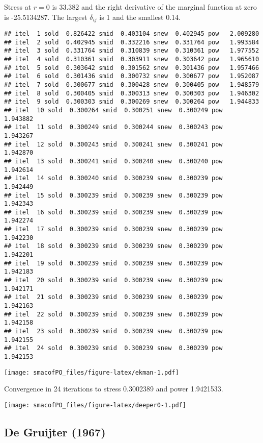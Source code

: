 \documentclass[
  12pt,
]{article}
\begin{document}
Stress at \(r=0\) is 33.382 and the right derivative of the marginal function at zero is -25.5134287. The largest \(\delta_{ij}\) is 1 and the smallest
0.14.

\begin{verbatim}
## itel  1 sold  0.826422 smid  0.403104 snew  0.402945 pow   2.009280 
## itel  2 sold  0.402945 smid  0.332216 snew  0.331764 pow   1.993584 
## itel  3 sold  0.331764 smid  0.310839 snew  0.310361 pow   1.977552 
## itel  4 sold  0.310361 smid  0.303911 snew  0.303642 pow   1.965610 
## itel  5 sold  0.303642 smid  0.301562 snew  0.301436 pow   1.957466 
## itel  6 sold  0.301436 smid  0.300732 snew  0.300677 pow   1.952087 
## itel  7 sold  0.300677 smid  0.300428 snew  0.300405 pow   1.948579 
## itel  8 sold  0.300405 smid  0.300313 snew  0.300303 pow   1.946302 
## itel  9 sold  0.300303 smid  0.300269 snew  0.300264 pow   1.944833 
## itel  10 sold  0.300264 smid  0.300251 snew  0.300249 pow   1.943882 
## itel  11 sold  0.300249 smid  0.300244 snew  0.300243 pow   1.943267 
## itel  12 sold  0.300243 smid  0.300241 snew  0.300241 pow   1.942870 
## itel  13 sold  0.300241 smid  0.300240 snew  0.300240 pow   1.942614 
## itel  14 sold  0.300240 smid  0.300239 snew  0.300239 pow   1.942449 
## itel  15 sold  0.300239 smid  0.300239 snew  0.300239 pow   1.942343 
## itel  16 sold  0.300239 smid  0.300239 snew  0.300239 pow   1.942274 
## itel  17 sold  0.300239 smid  0.300239 snew  0.300239 pow   1.942230 
## itel  18 sold  0.300239 smid  0.300239 snew  0.300239 pow   1.942201 
## itel  19 sold  0.300239 smid  0.300239 snew  0.300239 pow   1.942183 
## itel  20 sold  0.300239 smid  0.300239 snew  0.300239 pow   1.942171 
## itel  21 sold  0.300239 smid  0.300239 snew  0.300239 pow   1.942163 
## itel  22 sold  0.300239 smid  0.300239 snew  0.300239 pow   1.942158 
## itel  23 sold  0.300239 smid  0.300239 snew  0.300239 pow   1.942155 
## itel  24 sold  0.300239 smid  0.300239 snew  0.300239 pow   1.942153
\end{verbatim}

\texttt{[image: smacofPO\_files/figure-latex/ekman-1.pdf]}

Convergence in 24 iterations to stress 0.3002389 and power 1.9421533.

\texttt{[image: smacofPO\_files/figure-latex/deeper0-1.pdf]}

\subsection{De Gruijter (1967)}\label{degruijter_67}
\end{document}
